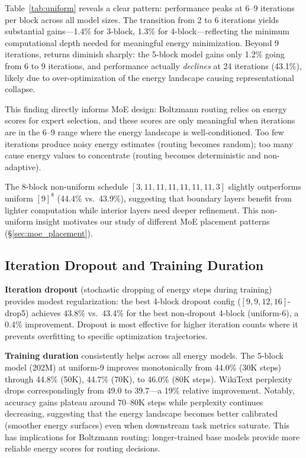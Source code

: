 \documentclass[oneside]{article}
\begin{document}
Table~\ref{tab:uniform} reveals a clear pattern: performance peaks at 6--9 iterations per block across all model sizes. The transition from 2 to 6 iterations yields substantial gains---1.4\% for 3-block, 1.3\% for 4-block---reflecting the minimum computational depth needed for meaningful energy minimization. Beyond 9 iterations, returns diminish sharply: the 5-block model gains only 1.2\% going from 6 to 9 iterations, and performance actually \textit{declines} at 24 iterations (43.1\%), likely due to over-optimization of the energy landscape causing representational collapse.

This finding directly informs MoE design: Boltzmann routing relies on energy scores for expert selection, and these scores are only meaningful when iterations are in the 6--9 range where the energy landscape is well-conditioned. Too few iterations produce noisy energy estimates (routing becomes random); too many cause energy values to concentrate (routing becomes deterministic and non-adaptive).

The 8-block non-uniform schedule $[3,11,11,11,11,11,11,3]$ slightly outperforms uniform $[9]^8$ (44.4\% vs.\ 43.9\%), suggesting that boundary layers benefit from lighter computation while interior layers need deeper refinement. This non-uniform insight motivates our study of different MoE placement patterns (\S\ref{sec:moe_placement}).


\subsection{Iteration Dropout and Training Duration}

\textbf{Iteration dropout} (stochastic dropping of energy steps during training) provides modest regularization: the best 4-block dropout config ($[9,9,12,16]$-drop5) achieves 43.8\% vs.\ 43.4\% for the best non-dropout 4-block (uniform-6), a 0.4\% improvement. Dropout is most effective for higher iteration counts where it prevents overfitting to specific optimization trajectories.

\textbf{Training duration} consistently helps across all energy models. The 5-block model (202M) at uniform-9 improves monotonically from 44.0\% (30K steps) through 44.8\% (50K), 44.7\% (70K), to 46.0\% (80K steps). WikiText perplexity drops correspondingly from 49.0 to 39.7---a 19\% relative improvement. Notably, accuracy gains plateau around 70--80K steps while perplexity continues decreasing, suggesting that the energy landscape becomes better calibrated (smoother energy surfaces) even when downstream task metrics saturate. This has implications for Boltzmann routing: longer-trained base models provide more reliable energy scores for routing decisions.
\end{document}

